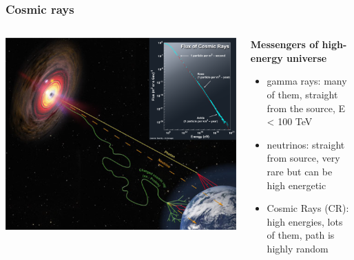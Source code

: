 \documentclass[aspectratio=1610, 9pt]{beamer}
\begin{document}
\begin{frame}\frametitle{Cosmic rays}
  \begin{columns}
    \begin{column}[c]{0.48\textwidth}
      \includegraphics[width=\textwidth]{plots/CR_cta.png}
    \end{column}
    \begin{column}[c]{0.48\textwidth}
      \textbf{Messengers of high-energy universe}
      \begin{itemize}
        \item gamma rays: many of them, straight from the source, E < 100 TeV
        \item neutrinos: straight from source, very rare but can be high energetic
        \item Cosmic Rays (CR): high energies, lots of them, path is highly random
      \end{itemize}
    \end{column}
  \end{columns}
\end{frame}
\end{document}
